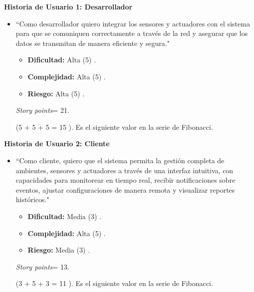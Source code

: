 \textbf{Historia de Usuario 1: Desarrollador}
\begin{itemize}
	\item ``Como desarrollador quiero integrar los sensores y actuadores con el sistema para que se comuniquen correctamente a través de la
	      red y asegurar que los datos se transmitan de manera eficiente y segura."

	      \begin{itemize}
		      \item \textbf{Dificultad:} Alta (5) .
		      \item \textbf{Complejidad:} Alta (5) .
		      \item \textbf{Riesgo:} Alta (5) .
	      \end{itemize}

	      \textit{Story points}= 21.

	      (5 + 5 + 5 = 15 ). Es el siguiente valor en la serie de Fibonacci.

\end{itemize}

\textbf{Historia de Usuario 2: Cliente}
\begin{itemize}
	\item ``Como cliente, quiero que el sistema permita la gestión completa de ambientes, sensores y actuadores a través de una interfaz intuitiva,
	      con capacidades para monitorear en tiempo real, recibir notificaciones sobre eventos, ajustar configuraciones de manera remota y visualizar
	      reportes históricos."

	      \begin{itemize}
		      \item \textbf{Dificultad:} Media (3) .
		      \item \textbf{Complejidad:} Alta (5) .
		      \item \textbf{Riesgo:} Media (3) .
	      \end{itemize}

	      \textit{Story points}= 13.

	      (3 + 5 + 3 = 11 ). Es el siguiente valor en la serie de Fibonacci.

\end{itemize}


